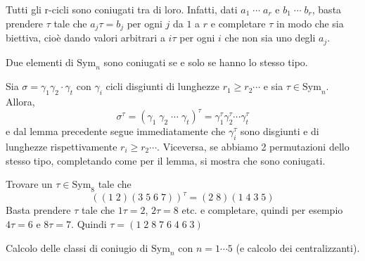 \documentclass[a4paper]{article}
\begin{document}
Tutti gli r-cicli sono coniugati tra di loro.
Infatti, dati \(a_1\; \cdots\; a_r\) e \(b_1\; \cdots\; b_r\),
basta prendere \(\tau\) tale che \(a_j \tau = b_j\) per ogni \(j\) da \(1\) a \(r\)
e completare \(\tau\) in modo che sia biettiva, cioè dando valori arbitrari a \(i\tau\)
per ogni \(i\) che non sia uno degli \(a_j\).

\begin{snippettheorem}{}
    Due elementi di \(\text{Sym}_n\) sono coniugati
    se e solo se hanno lo stesso tipo.
\end{snippettheorem}

\begin{snippetproof}{}
    Sia \(\sigma = \gamma_1\gamma_2 \cdot \gamma_t\) con \(\gamma_i\)
    cicli disgiunti di lunghezze \(r_1 \geq r_2 \cdots\)
    e sia \(\tau \in \text{Sym}_n\). Allora,
    \[
        \sigma^\tau =
        {(\gamma_1\; \gamma_2\; \cdots \; \gamma_t)}^\tau
        = \gamma_1^\tau \gamma_2^\tau \cdots \gamma_t^\tau
    \]
    e dal lemma precedente segue immediatamente che
    \(\gamma_i^\tau\) sono disgiunti e di lunghezze
    rispettivamente \(r_i \geq r_2 \cdots\).
    Viceversa, se abbiamo 2 permutazioni dello stesso tipo,
    completando come per il lemma, si mostra che
    sono coniugati.
\end{snippetproof}

\begin{snippetexercise}{}
    Trovare un \(\tau \in \text{Sym}_8\) tale che
    \[
        {\left((1\;2)(3\;5\;6\;7)\right)}^\tau = (2\;8)(1\;4\;3\;5)
    \]
    Basta prendere \(\tau\) tale che \(1\tau = 2\), \(2\tau = 8\) etc.
    e completare, quindi per esempio \(4\tau = 6\) e \(8\tau = 7\).
    Quindi \(\tau = (1\;2\;8\;7\;6\;4\;6\;3)\)
\end{snippetexercise}

\begin{snippetexample}{}
    Calcolo delle classi di coniugio di \(\text{Sym}_n\)
    con \(n=1 \cdots 5\) (e calcolo dei centralizzanti).
    

\end{snippetexample}
\end{document}
